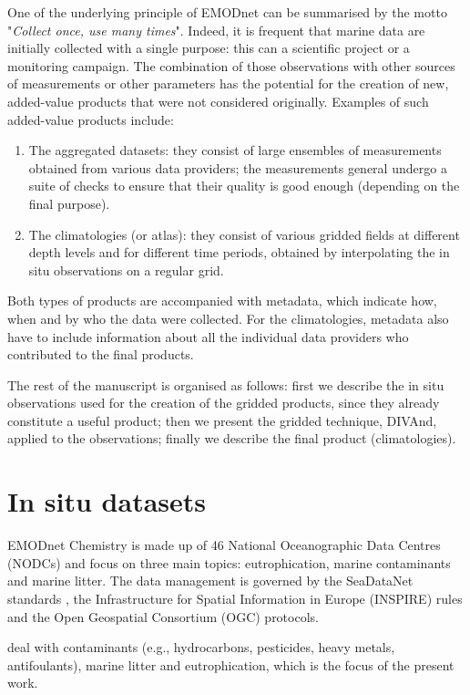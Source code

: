 \documentclass[essd, manuscript]{copernicus}
\begin{document}
One of the underlying principle of EMODnet can be summarised by the motto "\textit{Collect once, use many times}". Indeed, it is frequent that marine data are initially collected with a single purpose: this can a scientific project or a monitoring campaign. The combination of those observations with other sources of measurements or other parameters has the potential for the creation of new, added-value products that were not considered originally. Examples of such added-value products include:
\begin{enumerate}
\item The aggregated datasets: they consist of large ensembles of measurements obtained from various data providers; the measurements general undergo a suite of checks to ensure that their quality is good enough (depending on the final purpose).
\item The climatologies (or atlas): they consist of various gridded fields at different depth levels and for different time periods, obtained by interpolating the in situ observations on a regular grid.
\end{enumerate}

Both types of products are accompanied with metadata, which indicate how, when and by who the data were collected. For the climatologies, metadata also have to include information about all the individual data providers who contributed to the final products. 

The rest of the manuscript is organised as follows: first we describe the in situ observations used for the creation of the gridded products, since they already constitute a useful product; then we present the gridded technique, DIVAnd, applied to the observations; finally we describe the final product (climatologies). 


\section{In situ datasets\label{sec:insitu}}

EMODnet Chemistry is made up of 46 National Oceanographic Data Centres (NODCs) and focus on three main topics: eutrophication, marine contaminants and marine litter. The data management is governed by the SeaDataNet standards \citep{Schaap2010}, the Infrastructure for Spatial Information in Europe (INSPIRE) rules and the Open Geospatial Consortium (OGC) protocols. 

deal with contaminants (e.g., hydrocarbons, pesticides, heavy metals, antifoulants), marine litter and eutrophication, which is the focus of the present work.
\citep{Giorgetti2020}
\end{document}

